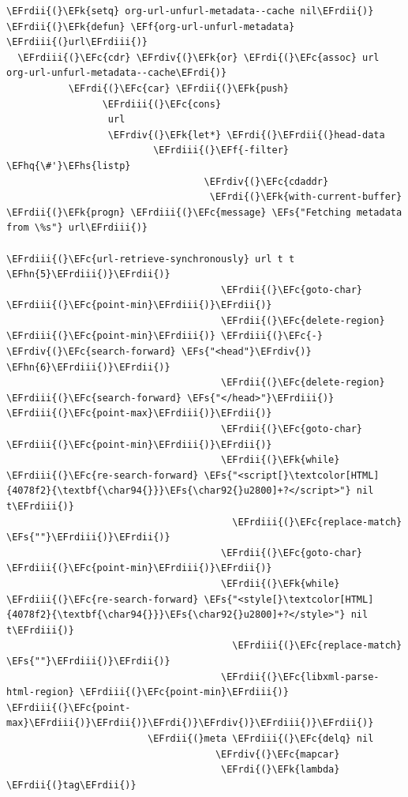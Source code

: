 \documentclass{scrartcl}
\newcommand{\EFk}[1]{\textcolor{EFk}{#1}} %
\newcommand{\EFs}[1]{\textcolor{EFs}{#1}} %
\newcommand{\EFc}[1]{\textcolor{EFc}{#1}} %
\newcommand{\EFf}[1]{\textcolor{EFf}{#1}} %
\newcommand{\EFhn}[1]{\textcolor{EFhn}{\textbf{#1}}} %
\newcommand{\EFhq}[1]{\textcolor{EFhq}{#1}} %
\newcommand{\EFhs}[1]{\textcolor{EFhs}{#1}} %
\newcommand{\EFrdi}[1]{\textcolor{EFrdi}{#1}} %
\newcommand{\EFrdii}[1]{\textcolor{EFrdii}{#1}} %
\newcommand{\EFrdiii}[1]{\textcolor{EFrdiii}{#1}} %
\newcommand{\EFrdiv}[1]{\textcolor{EFrdiv}{#1}} %
\begin{document}
\begin{Code}
\begin{Verbatim}[]
\EFrdii{(}\EFk{setq} org-url-unfurl-metadata--cache nil\EFrdii{)}
\EFrdii{(}\EFk{defun} \EFf{org-url-unfurl-metadata} \EFrdiii{(}url\EFrdiii{)}
  \EFrdiii{(}\EFc{cdr} \EFrdiv{(}\EFk{or} \EFrdi{(}\EFc{assoc} url org-url-unfurl-metadata--cache\EFrdi{)}
           \EFrdi{(}\EFc{car} \EFrdii{(}\EFk{push}
                 \EFrdiii{(}\EFc{cons}
                  url
                  \EFrdiv{(}\EFk{let*} \EFrdi{(}\EFrdii{(}head-data
                          \EFrdiii{(}\EFf{-filter} \EFhq{\#'}\EFhs{listp}
                                   \EFrdiv{(}\EFc{cdaddr}
                                    \EFrdi{(}\EFk{with-current-buffer} \EFrdii{(}\EFk{progn} \EFrdiii{(}\EFc{message} \EFs{"Fetching metadata from \%s"} url\EFrdiii{)}
                                                                \EFrdiii{(}\EFc{url-retrieve-synchronously} url t t \EFhn{5}\EFrdiii{)}\EFrdii{)}
                                      \EFrdii{(}\EFc{goto-char} \EFrdiii{(}\EFc{point-min}\EFrdiii{)}\EFrdii{)}
                                      \EFrdii{(}\EFc{delete-region} \EFrdiii{(}\EFc{point-min}\EFrdiii{)} \EFrdiii{(}\EFc{-} \EFrdiv{(}\EFc{search-forward} \EFs{"<head"}\EFrdiv{)} \EFhn{6}\EFrdiii{)}\EFrdii{)}
                                      \EFrdii{(}\EFc{delete-region} \EFrdiii{(}\EFc{search-forward} \EFs{"</head>"}\EFrdiii{)} \EFrdiii{(}\EFc{point-max}\EFrdiii{)}\EFrdii{)}
                                      \EFrdii{(}\EFc{goto-char} \EFrdiii{(}\EFc{point-min}\EFrdiii{)}\EFrdii{)}
                                      \EFrdii{(}\EFk{while} \EFrdiii{(}\EFc{re-search-forward} \EFs{"<script[}\textcolor[HTML]{4078f2}{\textbf{\char94{}}}\EFs{\char92{}u2800]+?</script>"} nil t\EFrdiii{)}
                                        \EFrdiii{(}\EFc{replace-match} \EFs{""}\EFrdiii{)}\EFrdii{)}
                                      \EFrdii{(}\EFc{goto-char} \EFrdiii{(}\EFc{point-min}\EFrdiii{)}\EFrdii{)}
                                      \EFrdii{(}\EFk{while} \EFrdiii{(}\EFc{re-search-forward} \EFs{"<style[}\textcolor[HTML]{4078f2}{\textbf{\char94{}}}\EFs{\char92{}u2800]+?</style>"} nil t\EFrdiii{)}
                                        \EFrdiii{(}\EFc{replace-match} \EFs{""}\EFrdiii{)}\EFrdii{)}
                                      \EFrdii{(}\EFc{libxml-parse-html-region} \EFrdiii{(}\EFc{point-min}\EFrdiii{)} \EFrdiii{(}\EFc{point-max}\EFrdiii{)}\EFrdii{)}\EFrdi{)}\EFrdiv{)}\EFrdiii{)}\EFrdii{)}
                         \EFrdii{(}meta \EFrdiii{(}\EFc{delq} nil
                                     \EFrdiv{(}\EFc{mapcar}
                                      \EFrdi{(}\EFk{lambda} \EFrdii{(}tag\EFrdii{)}

\end{Verbatim}
\end{Code}
\end{document}
